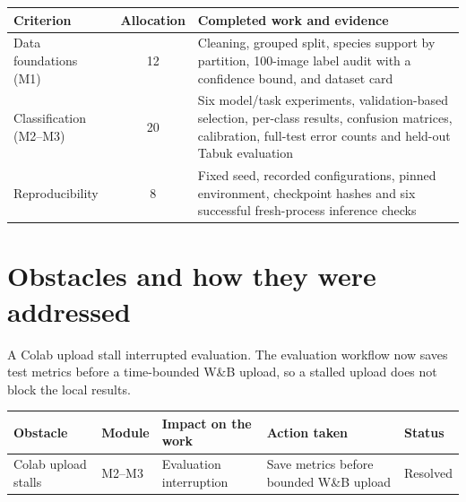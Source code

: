 \documentclass[11pt,a4paper]{article}
\begin{document}
\begin{tabularx}{\linewidth}{@{}l c Y@{}}
\toprule
Criterion & Allocation & Completed work and evidence \\
\midrule
Data foundations (M1) & 12 & Cleaning, grouped split, species support by partition, 100-image label audit with a confidence bound, and dataset card \\
Classification (M2--M3) & 20 & Six model/task experiments, validation-based selection, per-class results, confusion matrices, calibration, full-test error counts and held-out Tabuk evaluation \\
Reproducibility & 8 & Fixed seed, recorded configurations, pinned environment, checkpoint hashes and six successful fresh-process inference checks \\
\bottomrule
\end{tabularx}

\section{Obstacles and how they were addressed}

A Colab upload stall interrupted evaluation. The evaluation workflow now saves test metrics before a time-bounded W\&B upload, so a stalled upload does not block the local results.

\medskip
{\small
\begin{tabularx}{\linewidth}{@{}Y l Y Y l@{}}
\toprule
Obstacle & Module & Impact on the work & Action taken & Status \\
\midrule
Colab upload stalls & M2--M3 & Evaluation interruption & Save metrics before bounded W\&B upload & Resolved \\
\bottomrule
\end{tabularx}}
\end{document}
